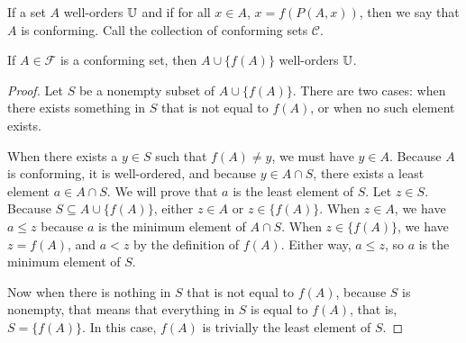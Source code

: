 \documentclass[../math.tex]{subfiles}
\begin{document}
\begin{definition}
    If a set $A$ well-orders $\mathbb{U}$ and if for all $x \in A$, $x = f(P(A, x))$,
    then we say that $A$ is conforming.  Call the collection of conforming sets
    $\mathcal C$.
\end{definition}

\begin{lemma} \label{conforming_add_wo}
    If $A \in \mathcal F$ is a conforming set, then $A \cup \{f(A)\}$
    well-orders $\mathbb{U}$.
\end{lemma}
\begin{proof}
    Let $S$ be a nonempty subset of $A \cup \{f(A)\}$.  There are two cases:
    when there exists something in $S$ that is not equal to $f(A)$, or when no
    such element exists.

    When there exists a $y \in S$ such that $f(A) \neq y$, we must have $y \in
    A$.  Because $A$ is conforming, it is well-ordered, and because $y \in A
    \cap S$, there exists a least element $a \in A \cap S$.  We will prove that
    $a$ is the least element of $S$.  Let $z \in S$.  Because $S \subseteq A
    \cup \{f(A)\}$, either $z \in A$ or $z \in \{f(A)\}$.  When $z \in A$, we
    have $a \leq z$ because $a$ is the minimum element of $A \cap S$.  When $z
    \in \{f(A)\}$, we have $z = f(A)$, and $a < z$ by the definition of $f(A)$.
    Either way, $a \leq z$, so $a$ is the minimum element of $S$.

    Now when there is nothing in $S$ that is not equal to $f(A)$, because $S$ is
    nonempty, that means that everything in $S$ is equal to $f(A)$, that is, $S
    = \{f(A)\}$.  In this case, $f(A)$ is trivially the least element of $S$.
\end{proof}
\end{document}
